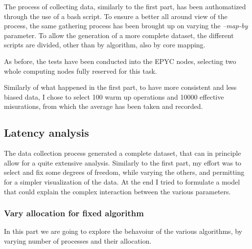 \documentclass{article}
\begin{document}
	The process of collecting data, similarly to the first part, has been authomatized through the use of a bash script. To ensure a better all around view of the process, the same gathering process has been brought up on varying the \textit{--map-by} parameter. To allow the generation of a more complete dataset, the different scripts are divided, other than by algorithm, also by core mapping.
	
	As before, the tests have been conducted into the EPYC nodes, selecting two whole computing nodes fully reserved for this task.
	
	Similarly of what happened in the first part, to have more consistent and less biased data, I chose to select 100 warm up operations and 10000 effective misurations, from which the average has been taken and recorded.
	
	\subsection{Latency analysis}
	
	The data collection process generated a complete dataset, that can in principle allow for a quite extensive analysis. Similarly to the first part, my effort was to select and fix some degrees of freedom, while varying the others, and permitting for a simpler visualization of the data.
	At the end I tried to formulate a model that could explain the complex interaction between the various parameters.
	
	\subsubsection{Vary allocation for fixed algorithm}
	
	In this part we are going to explore the behavoiur of the various algorithms, by varying number of processes and their allocation.
	
\end{document}
